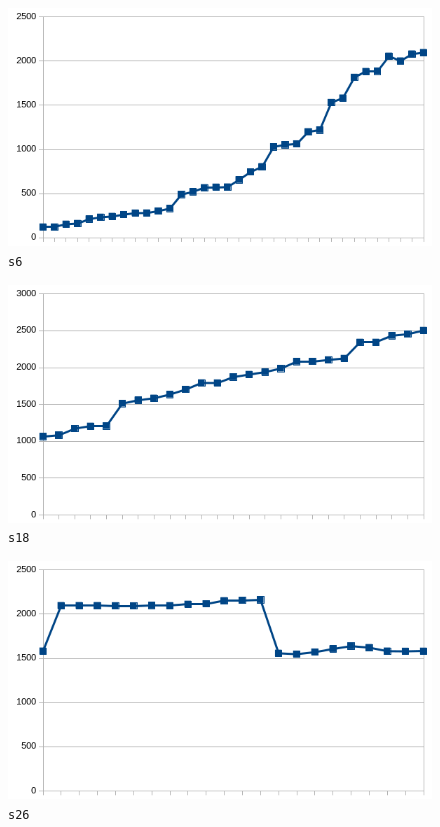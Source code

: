 \begin{figure}[h]
  \begin{minipage}{0.32\textwidth}
    \centering
    \includegraphics[scale=0.32]{imagens/evolution-s6.png}
    \texttt{s6}
  \end{minipage}
  \begin{minipage}{0.32\textwidth}
    \centering
    \includegraphics[scale=0.32]{imagens/evolution-s18.png}
    \texttt{s18}
  \end{minipage}
  \begin{minipage}{0.32\textwidth}
    \centering
    \includegraphics[scale=0.32]{imagens/evolution-s26.png}
    \texttt{s26}
  \end{minipage}


\end{figure}
